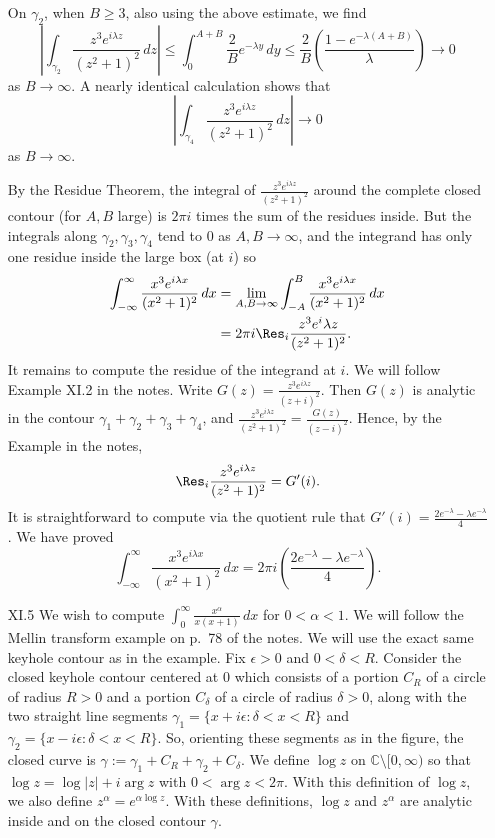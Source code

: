 \documentclass[11pt]{book}
\theoremstyle{definition}
\begin{document}
\begin{enumerate}
    On $\gamma_2$, when $B\geq 3$, also using the above estimate, we find 
    \[ \left| \int_{\gamma_2} \frac{z^3e^{i\lambda z}}{(z^2+1)^2} \, dz \right| \leq \int_0^{A+B} \frac{2}{B} e^{-\lambda y} \, dy \leq \frac 2 B \left( \frac{1- e^{-\lambda(A+B)}}{\lambda} \right) \to 0 \] as $B\to \infty$. 
    A nearly identical calculation shows that 
    \[  \left| \int_{\gamma_4} \frac{z^3e^{i\lambda z}}{(z^2+1)^2} \, dz \right| \to 0 \] as $B\to \infty$.   

    By the Residue Theorem, the integral of $\frac{z^3e^{i\lambda z}}{(z^2+1)^2}$  around the complete closed contour (for $A,B$ large) is $2\pi i$ times the sum of the residues inside.  But the integrals along $\gamma_2, \gamma_3, \gamma_4$ tend to $0$ as $A,B\to \infty$, and the integrand has only one residue inside the large box (at $i$) so 
    \begin{align*}
      \int_{-\infty}^{\infty} \frac{x^3e^{i\lambda x}}{(x^2+1)^2} \, dx &= \lim_{A,B\to \infty} \int_{-A}^{B} \frac{x^3e^{i\lambda x}}{(x^2+1)^2} \, dx \\
      &= 2\pi i \Res_i \frac{z^3e^i\lambda z}{(z^2+1)^2} .
    \end{align*}
    It remains to compute the residue of the integrand at $i$.  We will follow Example XI.2 in the notes.  Write $G(z) = \frac{z^3e^{i\lambda z}}{(z+i)^2}$.  Then $G(z)$ is analytic in the contour $\gamma_1 + \gamma_2 + \gamma_3 + \gamma_4$, and $\frac{z^3 e^{i\lambda z}}{(z^2+1)^2} = \frac{G(z)}{(z-i)^2}$.  Hence, by the Example in the notes, 
    \[ \Res_i \frac{z^3 e^{i\lambda z}}{(z^2+1)^2} = G'(i). \]  It is straightforward to compute via the quotient rule that $G'(i) = \frac{2e^{-\lambda} - \lambda e^{-\lambda}}{4}$.  We have proved 
    \[ \int_{-\infty}^{\infty} \frac{x^3e^{i\lambda x}}{(x^2+1)^2} \, dx  = 2\pi i \left(\frac{2e^{-\lambda} - \lambda e^{-\lambda}}{4} \right) .\] 

  \item[XI.5] We wish to compute $\int_0^\infty \frac{x^\alpha}{x(x+1)} \, dx$ for $0 < \alpha < 1$.  We will follow the Mellin transform example on p.~78 of the notes.  We will use the exact same keyhole contour as in the example.  Fix $\epsilon > 0$ and $0 < \delta < R$.  Consider the closed keyhole contour centered at $0$ which consists of a portion $C_R$ of a circle of radius $R>0$ and a portion $C_\delta$ of a circle of radius $\delta>0$, along with the two straight line segments $\gamma_1 = \{ x + i\epsilon : \delta < x < R \}$ and $\gamma_2 = \{ x- i\epsilon : \delta  < x < R \}$.  So, orienting these segments as in the figure, the closed curve is $\gamma := \gamma_1 + C_R  + \gamma_2  + C_\delta$.   We define $\log z$ on $\mathbb C \setminus [0,\infty)$ so that $\log z = \log |z| + i \arg z $ with $0 < \arg z < 2\pi$.  With this definition of $\log z$, we also define $z^\alpha = e^{\alpha \log z}$.   With these definitions, $\log z$ and $z^\alpha$ are analytic inside and on the closed contour $\gamma$. 
    

\end{enumerate}
\end{document}
